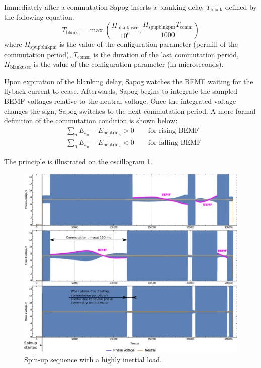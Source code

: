 \documentclass{zubaxdoc}
\begin{document}
Immediately after a commutation Sapog inserts a blanking delay $T_\text{blank}$
defined by the following equation:
\begin{equation}
T_{\text{blank}}=
\max \left(\frac{\Pi_{\text{blankusec}}}{10^6},
\frac{\Pi_{\text{spupblnkpm}} T_{\text{comm}}}{1000}\right)
\end{equation}
where $\Pi_{\text{spupblnkpm}}$ is the value of the configuration parameter 
(permill of the commutation period),
$T_{\text{comm}}$ is the duration of the last commutation period,
$\Pi_{\text{blankusec}}$ is the value of the configuration parameter 
(in microseconds).

Upon expiration of the blanking delay, Sapog watches the BEMF waiting for the flyback current to cease.
Afterwards, Sapog begins to integrate the sampled BEMF voltages relative to the neutral voltage.
Once the integrated voltage changes the sign, Sapog switches to the next commutation period.
A more formal definition of the commutation condition is shown below:
\begin{equation}
\begin{aligned}
&\sum_{n} E_{s_n} - E_{\text{neutral}_n} > 0 \qquad\text{for rising BEMF}\\
&\sum_{n} E_{s_n} - E_{\text{neutral}_n} < 0 \qquad\text{for falling BEMF}
\end{aligned}
\end{equation}

The principle is illustrated on the oscillogram \ref{spinup_phase_voltages}.

\begin{figure}[hbt]
    \centering
	\includegraphics[width=\textwidth]{spinup_phase_voltages}
	\caption{Spin-up sequence with a highly inertial load.
	\label{spinup_phase_voltages}}
\end{figure}
\end{document}
